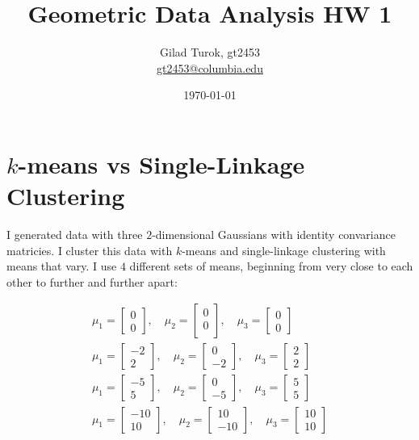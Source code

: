 \documentclass{article}
\title{Geometric Data Analysis HW 1}
\author{Gilad Turok, gt2453 \\ \href{mailto:gt2453@columbia.edu}{gt2453@columbia.edu}}
\date{\today}
\begin{document}
\maketitle

\section[]{$k$-means vs Single-Linkage Clustering}

    I generated data with three $2$-dimensional Gaussians with identity convariance matricies. I cluster this data with $k$-means and single-linkage clustering with means that vary. I use $4$ different sets of means, beginning from very close to each other to further and further apart:

    \begin{align*}
        \mu_1 = \begin{bmatrix} 0 \\ 0 \end{bmatrix}, \quad \mu_2 = \begin{bmatrix} 0 \\ 0 \\ \end{bmatrix}, \quad \mu_3 = \begin{bmatrix} 0 \\ 0 \end{bmatrix} \\
        \mu_1 = \begin{bmatrix} -2 \\ 2 \end{bmatrix}, \quad \mu_2 = \begin{bmatrix} 0 \\ -2 \end{bmatrix}, \quad \mu_3 = \begin{bmatrix} 2 \\ 2 \end{bmatrix} \\
        \mu_1 = \begin{bmatrix} -5 \\ 5 \end{bmatrix}, \quad \mu_2 = \begin{bmatrix} 0 \\ -5 \end{bmatrix}, \quad \mu_3 = \begin{bmatrix} 5 \\ 5 \end{bmatrix} \\
        \mu_1 = \begin{bmatrix} -10 \\ 10 \end{bmatrix}, \quad \mu_2 = \begin{bmatrix} 10 \\ -10 \end{bmatrix}, \quad \mu_3 = \begin{bmatrix} 10 \\ 10 \end{bmatrix} \\
    \end{align*}
\end{document}
